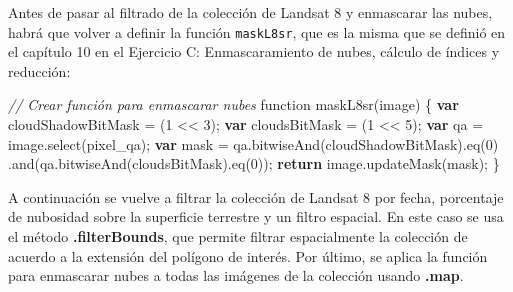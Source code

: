 \documentclass[
  12pt,
  letterpaper,
  twoside]{book}
\newenvironment{Shaded}{\begin{snugshade}}{\end{snugshade}}
\newcommand{\CommentTok}[1]{\textcolor[rgb]{0.24,0.58,0.00}{\textit{#1}}}
\newcommand{\ControlFlowTok}[1]{\textcolor[rgb]{0.00,0.00,0.00}{\textbf{#1}}}
\newcommand{\DecValTok}[1]{\textcolor[rgb]{0.28,0.53,0.93}{#1}}
\newcommand{\FunctionTok}[1]{\textcolor[rgb]{0.48,0.12,0.64}{#1}}
\newcommand{\KeywordTok}[1]{\textcolor[rgb]{0.48,0.12,0.64}{#1}}
\newcommand{\NormalTok}[1]{#1}
\newcommand{\OperatorTok}[1]{\textcolor[rgb]{0.00,0.00,0.00}{#1}}
\newcommand{\StringTok}[1]{\textcolor[rgb]{0.87,0.29,0.22}{#1}}
\newcommand\boldpurple[1]{\textcolor{darkpurple}{\textbf{#1}}}
\begin{document}
Antes de pasar al filtrado de la colección de Landsat 8 y enmascarar las nubes, habrá que volver a definir la función \texttt{maskL8sr}, que es la misma que se definió en el capítulo 10 en el Ejercicio C: Enmascaramiento de nubes, cálculo de índices y reducción:

\begin{Shaded}
\begin{Highlighting}[]
\CommentTok{// Crear función para enmascarar nubes}
\KeywordTok{function} \FunctionTok{maskL8sr}\NormalTok{(image) \{}
  \ControlFlowTok{var}\NormalTok{ cloudShadowBitMask }\OperatorTok{=}\NormalTok{ (}\DecValTok{1} \OperatorTok{\textless{}\textless{}} \DecValTok{3}\NormalTok{)}\OperatorTok{;}
  \ControlFlowTok{var}\NormalTok{ cloudsBitMask }\OperatorTok{=}\NormalTok{ (}\DecValTok{1} \OperatorTok{\textless{}\textless{}} \DecValTok{5}\NormalTok{)}\OperatorTok{;}
  \ControlFlowTok{var}\NormalTok{ qa }\OperatorTok{=}\NormalTok{ image}\OperatorTok{.}\FunctionTok{select}\NormalTok{(}\StringTok{\textquotesingle{}pixel\_qa\textquotesingle{}}\NormalTok{)}\OperatorTok{;}
  \ControlFlowTok{var}\NormalTok{ mask }\OperatorTok{=}\NormalTok{ qa}\OperatorTok{.}\FunctionTok{bitwiseAnd}\NormalTok{(cloudShadowBitMask)}\OperatorTok{.}\FunctionTok{eq}\NormalTok{(}\DecValTok{0}\NormalTok{)}
                 \OperatorTok{.}\FunctionTok{and}\NormalTok{(qa}\OperatorTok{.}\FunctionTok{bitwiseAnd}\NormalTok{(cloudsBitMask)}\OperatorTok{.}\FunctionTok{eq}\NormalTok{(}\DecValTok{0}\NormalTok{))}\OperatorTok{;}
  \ControlFlowTok{return}\NormalTok{ image}\OperatorTok{.}\FunctionTok{updateMask}\NormalTok{(mask)}\OperatorTok{;}
\NormalTok{\}}
\end{Highlighting}
\end{Shaded}

A continuación se vuelve a filtrar la colección de Landsat 8 por fecha, porcentaje de nubosidad sobre la superficie terrestre y un filtro espacial. En este caso se usa el método \boldpurple{.filterBounds}, que permite filtrar espacialmente la colección de acuerdo a la extensión del polígono de interés. Por último, se aplica la función para enmascarar nubes a todas las imágenes de la colección usando \boldpurple{.map}.
\end{document}
